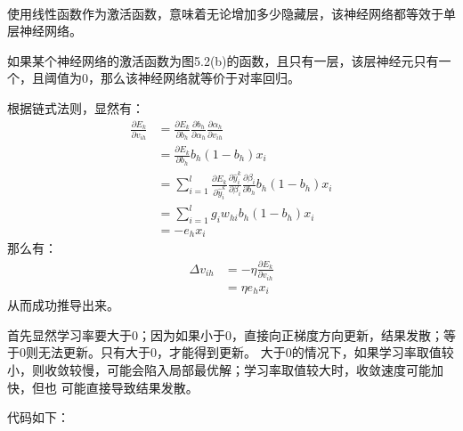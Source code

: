 \documentclass{ctexart}
\newcounter{answercnt}
\newcommand{\sCourse}{机器学习}   %
\newcommand{\nTime}{五}             %
\newcommand{\sName}{黄昊}           %
\newcommand{\sNumber}{20204205}     %
\begin{document}
    \setcounter{answercnt}{0}
    \begin{center}
        \\
        \fontsize{13pt}{0}{\textit{\kaishu\sName\qquad\sNumber}}
    \end{center}

\answer[5.1]\answer[5.2]\answer[5.3]\answer[5.4]\answer[5.5]

\answer[5.1]
使用线性函数作为激活函数，意味着无论增加多少隐藏层，该神经网络都等效于单层神经网络。

\answer[5.2]
如果某个神经网络的激活函数为图5.2(b)的函数，且只有一层，该层神经元只有一个，且阈值为0，那么该神经网络就等价于对率回归。

\answer[5.3]
根据链式法则，显然有：
$$
\begin{aligned}
\frac{\partial E_k}{\partial v_{ih}}
&=\frac{\partial E_k}{\partial b_{h}}\frac{\partial b_h}{\partial \alpha_{h}}\frac{\partial \alpha_h}{\partial v_{ih}}\\
&=\frac{\partial E_k}{\partial b_{h}}b_h(1-b_h)x_i\\
&=\sum_{i=1}^l\frac{\partial E_k}{\partial \hat y^k_{i}}\frac{\partial \hat y_i^k}{\partial \beta_{i}}
\frac{\partial \beta_i}{\partial b_{h}}b_h(1-b_h)x_i\\
&=\sum_{i=1}^l g_i w_{hi} b_h(1-b_h)x_i\\
&=-e_h x_i
\end{aligned}
$$
那么有：
$$
\begin{aligned}
    \Delta v_{ih} &= -\eta \frac{\partial E_k}{\partial v_{ih}}\\
    &=\eta e_h x_i
\end{aligned}
$$
从而成功推导出来。

\answer[5.4]
首先显然学习率要大于0；因为如果小于0，直接向正梯度方向更新，结果发散；等于0则无法更新。只有大于0，才能得到更新。
大于0的情况下，如果学习率取值较小，则收敛较慢，可能会陷入局部最优解；学习率取值较大时，收敛速度可能加快，但也
可能直接导致结果发散。

\answer[5.5]
代码如下：
\end{document}
